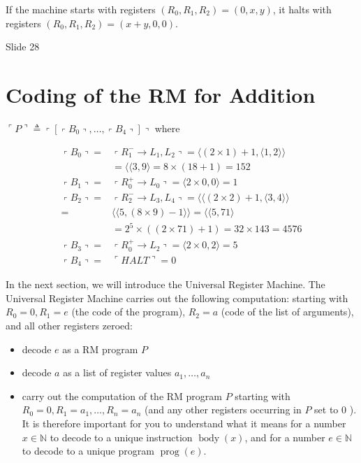 \documentclass[10pt]{article}
\begin{document}
If the machine starts with registers $\left(R_{0}, R_{1}, R_{2}\right)=(0, x, y)$, it halts with registers $\left(R_{0}, R_{1}, R_{2}\right)=(x+y, 0,0)$.

Slide 28

\section*{Coding of the RM for Addition}
$\ulcorner P\urcorner \triangleq\left\ulcorner\left[\left\ulcorner B_{0}\right\urcorner, \ldots,\left\ulcorner B_{4}\right\urcorner\right]\right\urcorner$ where

$$
\begin{aligned}
\left\ulcorner B_{0}\right\urcorner= & \left\ulcorner R_{1}^{-} \rightarrow L_{1}, L_{2}\right\urcorner=\langle(2 \times 1)+1,\langle 1,2\rangle\rangle \\
& =\langle\langle 3,9\rangle=8 \times(18+1)=152 \\
\left\ulcorner B_{1}\right\urcorner= & \left\ulcorner R_{0}^{+} \rightarrow L_{0}\right\urcorner=\langle 2 \times 0,0\rangle=1 \\
\left\ulcorner B_{2}\right\urcorner= & \left\ulcorner R_{2}^{-} \rightarrow L_{3}, L_{4}\right\urcorner=\langle\langle(2 \times 2)+1,\langle 3,4\rangle\rangle \\
= & \langle\langle 5,(8 \times 9)-1\rangle\rangle=\langle\langle 5,71\rangle \\
& =2^{5} \times((2 \times 71)+1)=32 \times 143=4576 \\
\left\ulcorner B_{3}\right\urcorner= & \left\ulcorner R_{0}^{+} \rightarrow L_{2}\right\urcorner=\langle 2 \times 0,2\rangle=5 \\
\left\ulcorner B_{4}\right\urcorner= & \ulcorner H A L T\urcorner=0
\end{aligned}
$$

In the next section, we will introduce the Universal Register Machine. The Universal Register Machine carries out the following computation: starting with $R_{0}=0, R_{1}=e$ (the code of the program), $R_{2}=a$ (code of the list of arguments), and all other registers zeroed:

\begin{itemize}
  \item decode $e$ as a RM program $P$
  \item decode $a$ as a list of register values $a_{1}, \ldots, a_{n}$
  \item carry out the computation of the RM program $P$ starting with $R_{0}=0, R_{1}=a_{1}, \ldots, R_{n}=a_{n}$ (and any other registers occurring in $P$ set to 0 ).\\
It is therefore important for you to understand what it means for a number $x \in \mathbb{N}$ to decode to a unique instruction $\operatorname{body}(x)$, and for a number $e \in \mathbb{N}$ to decode to a unique program $\operatorname{prog}(e)$.
\end{itemize}
\end{document}
